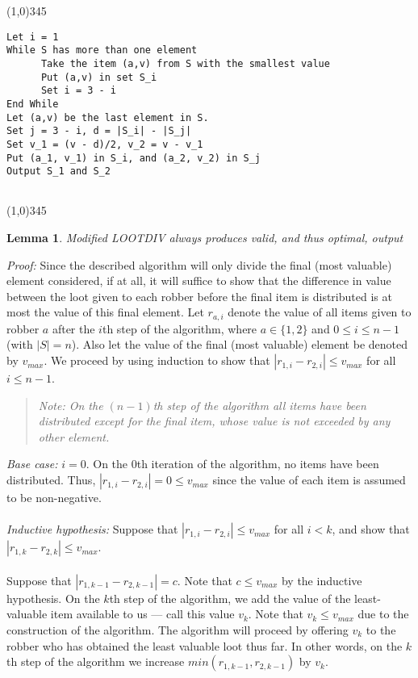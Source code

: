 \documentclass{article}
\newtheorem{lemma}[theorem]{Lemma}
\begin{document}
\begin{center}
\line(1,0){345}
\end{center}

\begin{verbatim}
Let i = 1
While S has more than one element
      Take the item (a,v) from S with the smallest value
      Put (a,v) in set S_i
      Set i = 3 - i
End While
Let (a,v) be the last element in S.
Set j = 3 - i, d = |S_i| - |S_j|
Set v_1 = (v - d)/2, v_2 = v - v_1
Put (a_1, v_1) in S_i, and (a_2, v_2) in S_j
Output S_1 and S_2
   
\end{verbatim}

\begin{center}
\line(1,0){345}
\end{center}

\begin{lemma}
Modified LOOTDIV always produces valid, and thus optimal, output
\end{lemma}

\textit{Proof:} Since the described algorithm will only divide the final (most valuable) element considered, if at all, it will suffice to show that the difference in value between the loot given to each robber before the final item is distributed is at most the value of this final element. Let $r_{a, i}$ denote the value of all items given to robber $a$ after the $i$th step of the algorithm, where $a \in \{1, 2\}$ and $0 \leq i \leq n - 1$ (with $|S| = n$). Also let the value of the final (most valuable) element be denoted by $v_{max}$. We proceed by using induction to show that $|r_{1, i} - r_{2, i}| \leq v_{max}$ for all $i \leq n - 1$.
\begin{quote}
	\textit{Note: On the $(n - 1)$th step of the algorithm all items have been distributed except for the final item, whose value is not exceeded by any other element.}
\end{quote}

\noindent\textit{Base case: } $i = 0$. On the $0$th iteration of the algorithm, no items have been distributed. Thus, $|r_{1, i} - r_{2, i}| = 0 \leq v_{max}$ since the value of each item is assumed to be non-negative. \\ \\
\textit{Inductive hypothesis: } Suppose that $|r_{1, i} - r_{2, i}| \leq v_{max}$ for all $i < k$, and show that $|r_{1, k} - r_{2, k}| \leq v_{max}$. \\ \\
Suppose that $|r_{1, k-1} - r_{2, k-1}| = c$. Note that $c \leq v_{max}$ by the inductive hypothesis. On the $k$th step of the algorithm, we add the value of the least-valuable item available to us --- call this value $v_{k}$. Note that $v_{k} \leq v_{max}$ due to the construction of the algorithm. The algorithm will proceed by offering $v_{k}$ to the robber who has obtained the least valuable loot thus far. In other words, on the $k$th step of the algorithm we increase $min(r_{1, k-1}, r_{2, k-1})$ by $v_{k}$. 
\end{document}
